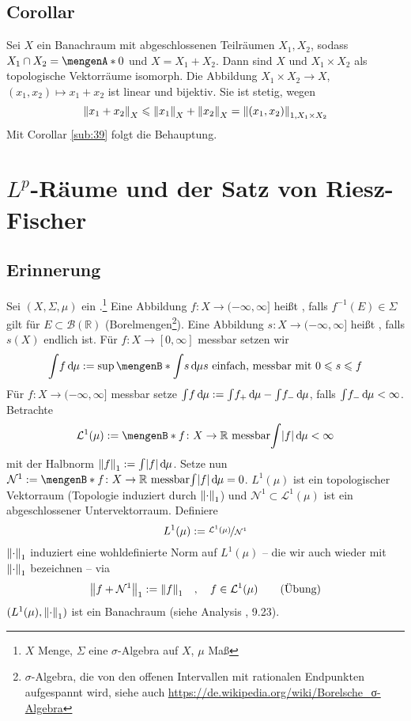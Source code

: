 \subsection[Corollar: Wenn $X= X_1 \oplus X_2$, so ist $X$ isomorph zu $X_1 \times X_2$]{Corollar} %
\label{sub:311}
Sei $X$ ein Banachraum mit abgeschlossenen Teilräumen $X_1,X_2$, sodass $X_1 \cap X_2 = \set{0}$ und $X= X_1 + X_2$. Dann sind $X$ und $X_1 \times X_2$ als topologische
Vektorräume isomorph.
Die Abbildung $X_1 \times X_2 \to X$, $(x_1,x_2) \mapsto x_1 + x_2$ ist linear und bijektiv. Sie ist stetig, wegen 
\[
	\norm[X]{x_1 + x_2} \le \norm[X]{x_1} + \norm[X]{x_2} = \norm[1,X_1 \times X_2]{(x_1,x_2)} 
\]
Mit Corollar \ref{sub:39} folgt die Behauptung. \bewende
\newpage

\section{$L^p$-Räume und der Satz von Riesz-Fischer} %
\label{sec:4}

\subsection[Erinnerung: $L^1(\mu)$ ist ein Banachraum]{Erinnerung} %
\label{sub:41}
Sei $(X,\Sigma, \mu)$ ein .\footnote{$X$ Menge, $\Sigma$ eine $\sigma$-Algebra auf $X$, $\mu$ Maß} Eine Abbildung $f\colon X \to (-\infty,\infty]$ heißt 
, falls $f ^{-1}(E) \in \Sigma$ gilt für $E \subset \mathcal{B}(\mathds{R})$ (Borelmengen\footnote{$\sigma$-Algebra, die von den offenen Intervallen mit 
rationalen Endpunkten aufgespannt wird, siehe auch \url{https://de.wikipedia.org/wiki/Borelsche_σ-Algebra}}). Eine Abbildung $s\colon X \to (-\infty,\infty]$ heißt 
, falls $s(X)$ endlich ist. Für $f \colon X \to [0,\infty]$ messbar setzen wir
\[
	\int \! f  \, \mathd \mu := \sup \set[\int \! s \, \mathd \mu]{s \text{ einfach, messbar mit } 0 \le s \le f} 
\] 
Für $f\colon X \to (-\infty,\infty]$ messbar setze $\int\! f \, \mathrm{d}\mkern-1.0mu \mu := \int \! f_+ \, \mathrm{d}\mkern-1.0mu \mu - \int \! f_- \, \mathrm{d}\mkern-1.0mu \mu$, falls 
$\int \! f_- \, \mathrm{d}\mkern-1.0mu \mu < \infty$. Betrachte
\begin{align*}
	\mathcal{L}^1(\mu) := \set[f \colon X \to \mathds{R} \text{ messbar}]{\int \abs*{f}\,\mathd \mu < \infty } 
\end{align*}
mit der Halbnorm $\norm[1]{f} := \int \abs*{f} \, \mathd \mu $. Setze nun $\mathcal{N}^1 := \set[f\colon X\to\mathds{R} \text{ messbar}]{\int \abs*{f} \, \mathd \mu =0 }$.
$L^1(\mu)$ ist ein topologischer Vektorraum (Topologie induziert durch $\norm[1]{\cdot}$) und $\mathcal{N}^1 \subset \mathcal{L}^1(\mu)$ ist ein abgeschlossener 
Untervektorraum. Definiere 
\[
	L^1(\mu) := \nicefrac{\mathcal{L}^1(\mu)}{\mathcal{N}^1}
\]
$\norm[1]{\cdot }$ induziert eine wohldefinierte Norm auf $L^1(\mu)$ -- die wir auch wieder mit $\norm[1]{\cdot }$ bezeichnen -- via  
\[
	\norm[1]{f+ \mathcal{N}^1} := \norm[1]{f} \quad , \quad f \in \mathcal{L}^1(\mu) \tag*{(Übung)}
\]
$(L^1(\mu),\norm[1]{\cdot})$ ist ein Banachraum (siehe Analysis , 9.23).

